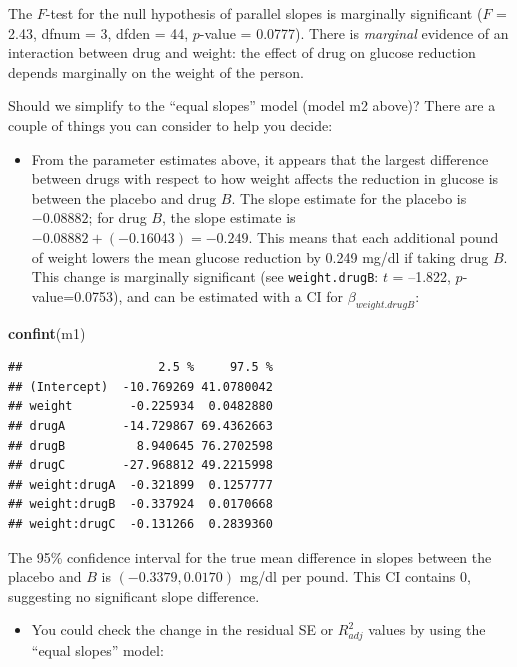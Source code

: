 \documentclass[
]{book}
\newenvironment{Shaded}{\begin{snugshade}}{\end{snugshade}}
\newcommand{\FunctionTok}[1]{\textcolor[rgb]{0.13,0.29,0.53}{\textbf{#1}}}
\newcommand{\NormalTok}[1]{#1}
\providecommand{\tightlist}{%
  \setlength{\itemsep}{0pt}\setlength{\parskip}{0pt}}
\begin{document}
The \(F\)-test for the null hypothesis of parallel slopes is marginally significant (\(F\) = 2.43, dfnum = 3, dfden = 44, \(p\)-value = 0.0777). There is \emph{marginal} evidence of an interaction between drug and weight: the effect of drug on glucose reduction depends marginally on the weight of the person.

Should we simplify to the ``equal slopes'' model (model m2 above)? There are a couple of things you can consider to help you decide:

\begin{itemize}
\tightlist
\item
  From the parameter estimates above, it appears that the largest difference between drugs with respect to how weight affects the reduction in glucose is between the placebo and drug \(B\). The slope estimate for the placebo is \(-0.08882\); for drug \(B\), the slope estimate is \(-0.08882 + (-0.16043) = -0.249\). This means that each additional pound of weight lowers the mean glucose reduction by 0.249 mg/dl if taking drug \(B\). This change is marginally significant (see \texttt{weight.drugB}: \(t\) = --1.822, \(p\)-value=0.0753), and can be estimated with a CI for \(\beta_{weight.drugB}\):
\end{itemize}

\begin{Shaded}
\begin{Highlighting}[]
\FunctionTok{confint}\NormalTok{(m1)}
\end{Highlighting}
\end{Shaded}

\begin{verbatim}
##                   2.5 %     97.5 %
## (Intercept)  -10.769269 41.0780042
## weight        -0.225934  0.0482880
## drugA        -14.729867 69.4362663
## drugB          8.940645 76.2702598
## drugC        -27.968812 49.2215998
## weight:drugA  -0.321899  0.1257777
## weight:drugB  -0.337924  0.0170668
## weight:drugC  -0.131266  0.2839360
\end{verbatim}

The 95\% confidence interval for the true mean difference in slopes between the placebo and \(B\) is \((-0.3379, 0.0170)\) mg/dl per pound. This CI contains 0, suggesting no significant slope difference.

\begin{itemize}
\tightlist
\item
  You could check the change in the residual SE or \(R_{adj}^2\) values by using the ``equal slopes'' model:
\end{itemize}
\end{document}
